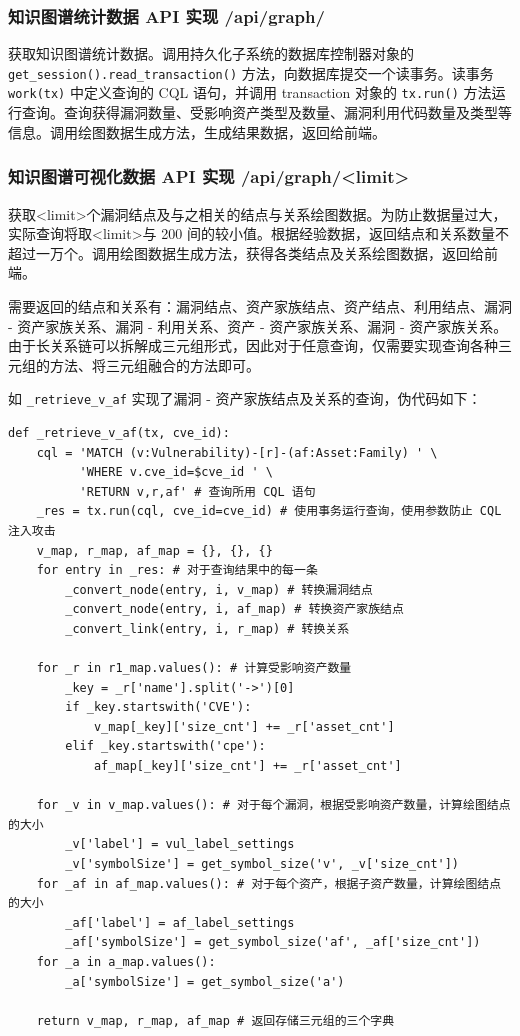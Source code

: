 \documentclass[a4paper,AutoFakeBold,oneside,12pt]{book}
\begin{document}
\subsubsection{知识图谱统计数据 API 实现 /api/graph/}

获取知识图谱统计数据。调用持久化子系统的数据库控制器对象的 \lstinline|get_session().read_transaction()| 方法，向数据库提交一个读事务。读事务 \lstinline|work(tx)| 中定义查询的 CQL 语句，并调用 transaction 对象的 \lstinline|tx.run()| 方法运行查询。查询获得漏洞数量、受影响资产类型及数量、漏洞利用代码数量及类型等信息。调用绘图数据生成方法，生成结果数据，返回给前端。

\subsubsection{知识图谱可视化数据 API 实现 /api/graph/<limit>\label{subsubsec:/api/graph/limit}}

获取<limit>个漏洞结点及与之相关的结点与关系绘图数据。为防止数据量过大，实际查询将取<limit>与 200 间的较小值。根据经验数据，返回结点和关系数量不超过一万个。调用绘图数据生成方法，获得各类结点及关系绘图数据，返回给前端。

需要返回的结点和关系有：漏洞结点、资产家族结点、资产结点、利用结点、漏洞 - 资产家族关系、漏洞 - 利用关系、资产 - 资产家族关系、漏洞 - 资产家族关系。由于长关系链可以拆解成三元组形式，因此对于任意查询，仅需要实现查询各种三元组的方法、将三元组融合的方法即可。

如 \lstinline|_retrieve_v_af| 实现了漏洞 - 资产家族结点及关系的查询，伪代码如下：
\begin{lstlisting}[style=lgeneral]
def _retrieve_v_af(tx, cve_id):
	cql = 'MATCH (v:Vulnerability)-[r]-(af:Asset:Family) ' \
	      'WHERE v.cve_id=$cve_id ' \
	      'RETURN v,r,af' # 查询所用 CQL 语句
	_res = tx.run(cql, cve_id=cve_id) # 使用事务运行查询，使用参数防止 CQL 注入攻击
	v_map, r_map, af_map = {}, {}, {}
	for entry in _res: # 对于查询结果中的每一条
		_convert_node(entry, i, v_map) # 转换漏洞结点
		_convert_node(entry, i, af_map) # 转换资产家族结点
		_convert_link(entry, i, r_map) # 转换关系

	for _r in r1_map.values(): # 计算受影响资产数量
		_key = _r['name'].split('->')[0]
		if _key.startswith('CVE'):
			v_map[_key]['size_cnt'] += _r['asset_cnt']
		elif _key.startswith('cpe'):
			af_map[_key]['size_cnt'] += _r['asset_cnt']
	
	for _v in v_map.values(): # 对于每个漏洞，根据受影响资产数量，计算绘图结点的大小
		_v['label'] = vul_label_settings
		_v['symbolSize'] = get_symbol_size('v', _v['size_cnt'])
	for _af in af_map.values(): # 对于每个资产，根据子资产数量，计算绘图结点的大小
		_af['label'] = af_label_settings
		_af['symbolSize'] = get_symbol_size('af', _af['size_cnt'])
	for _a in a_map.values():
		_a['symbolSize'] = get_symbol_size('a')

	return v_map, r_map, af_map # 返回存储三元组的三个字典
\end{lstlisting}
\end{document}
